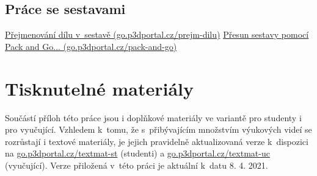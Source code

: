 \section{Práce se sestavami} \label{videa-sestavy}
\href{https://go.p3dportal.cz/prejm-dilu}{Přejmenování dílu v~sestavě (go.p3dportal.cz/prejm-dilu)} \newline
\href{https://go.p3dportal.cz/pack-and-go}{Přesun sestavy pomocí Pack and Go... (go.p3dportal.cz/pack-and-go)} \newline

\chapter{Tisknutelné materiály}
Součástí příloh této práce jsou i doplňkové materiály ve variantě pro studenty i pro vyučující.
Vzhledem k~tomu, že s~přibývajícím množstvím výukových videí se rozrůstají i textové materiály, je jejich pravidelně aktualizovaná verze k~dispozici na \href{https://go.p3dportal.cz/textmat-st}{go.p3dportal.cz/textmat-st} (studenti) a \href{https://go.p3dportal.cz/textmat-uc}{go.p3dportal.cz/textmat-uc} (vyučující).
Verze přiložená v~této práci je aktuální k~datu 8. 4. 2021.
